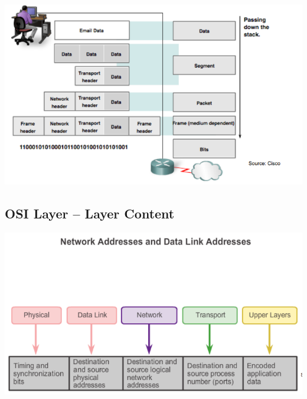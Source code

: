 \documentclass[11pt]{article}
\begin{document}
\includegraphics[width=\textwidth]{encapsulation-and-segmentation-2}
\subsection{OSI Layer – Layer Content}
\includegraphics[width=\textwidth]{osi-layer-content}
\end{document}
